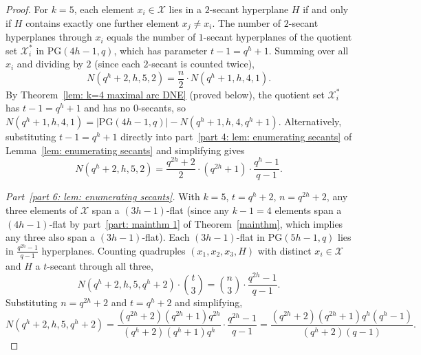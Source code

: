 \documentclass[10pt,a4paper]{amsart}
\begin{document}
\begin{proof}
		For $k=5$, each element $x_i \in \mathcal{X}$ lies in a $2$-secant hyperplane $H$ if and only if $H$ contains exactly one further element $x_j \ne x_i$. The number of $2$-secant hyperplanes through $x_i$ equals the number of $1$-secant hyperplanes of the quotient set $\mathcal{X}_i^*$ in $\mathrm{PG}(4h-1,q)$, which has parameter $t-1=q^h+1$. Summing over all $x_i$ and dividing by $2$ (since each $2$-secant is counted twice),
		$$
		N(q^h+2,h,5,2) = \frac{n}{2}\cdot N(q^h+1,h,4,1).
		$$
		By Theorem~\ref{lem: k=4 maximal arc DNE} (proved below), the quotient set $\mathcal{X}_i^*$ has $t-1=q^h+1$ and has no $0$-secants, so $N(q^h+1,h,4,1) = |\mathrm{PG}(4h-1,q)| - N(q^h+1,h,4,q^h+1)$. Alternatively, substituting $t-1=q^h+1$ directly into part~\ref{part 4: lem: enumerating secants} of Lemma~\ref{lem: enumerating secants} and simplifying gives
		$$
		N(q^h+2,h,5,2) = \frac{q^{2h}+2}{2}\cdot (q^{2h}+1)\cdot\frac{q^h-1}{q-1}.
		$$
		
		\medskip\noindent\textit{Part~\ref{part 6: lem: enumerating secants}.}
		With $k=5$, $t=q^h+2$, $n=q^{2h}+2$, any three elements of $\mathcal{X}$ span a $(3h-1)$-flat (since any $k-1=4$ elements span a $(4h-1)$-flat by part~\ref{part: mainthm 1} of Theorem~\ref{mainthm}, which implies any three also span a $(3h-1)$-flat). Each $(3h-1)$-flat in $\mathrm{PG}(5h-1,q)$ lies in $\frac{q^{2h}-1}{q-1}$ hyperplanes. Counting quadruples $(x_1,x_2,x_3,H)$ with distinct $x_i \in \mathcal{X}$ and $H$ a $t$-secant through all three,
		$$
		N(q^h+2,h,5,q^h+2)\cdot \binom{t}{3} = \binom{n}{3}\cdot\frac{q^{2h}-1}{q-1}.
		$$
		Substituting $n=q^{2h}+2$ and $t=q^h+2$ and simplifying,
		$$
		N(q^h+2,h,5,q^h+2) = \frac{(q^{2h}+2)(q^{2h}+1)q^{2h}}{(q^h+2)(q^h+1)q^h}\cdot\frac{q^{2h}-1}{q-1} = \frac{(q^{2h}+2)(q^{2h}+1)q^h(q^h-1)}{(q^h+2)(q-1)}.
		$$
	\end{proof}
\end{document}
